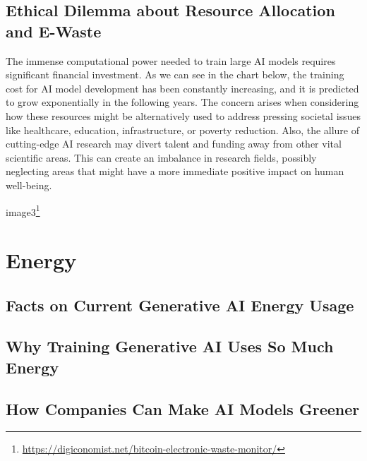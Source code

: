 \documentclass[
]{book}
\begin{document}
\hypertarget{ethical-dilemma-about-resource-allocation-and-e-waste}{%
\section{Ethical Dilemma about Resource Allocation and E-Waste}\label{ethical-dilemma-about-resource-allocation-and-e-waste}}

The immense computational power needed to train large AI models requires significant financial investment. As we can see in the chart below, the training cost for AI model development has been constantly increasing, and it is predicted to grow exponentially in the following years. The concern arises when considering how these resources might be alternatively used to address pressing societal issues like healthcare, education, infrastructure, or poverty reduction. Also, the allure of cutting-edge AI research may divert talent and funding away from other vital scientific areas. This can create an imbalance in research fields, possibly neglecting areas that might have a more immediate positive impact on human well-being.

image3\footnote{\url{https://digiconomist.net/bitcoin-electronic-waste-monitor/}}

\hypertarget{energy}{%
\chapter{Energy}\label{energy}}

\hypertarget{facts-on-current-generative-ai-energy-usage}{%
\section{Facts on Current Generative AI Energy Usage}\label{facts-on-current-generative-ai-energy-usage}}

\hypertarget{why-training-generative-ai-uses-so-much-energy}{%
\section{Why Training Generative AI Uses So Much Energy}\label{why-training-generative-ai-uses-so-much-energy}}

\hypertarget{how-companies-can-make-ai-models-greener}{%
\section{How Companies Can Make AI Models Greener}\label{how-companies-can-make-ai-models-greener}}
\end{document}
